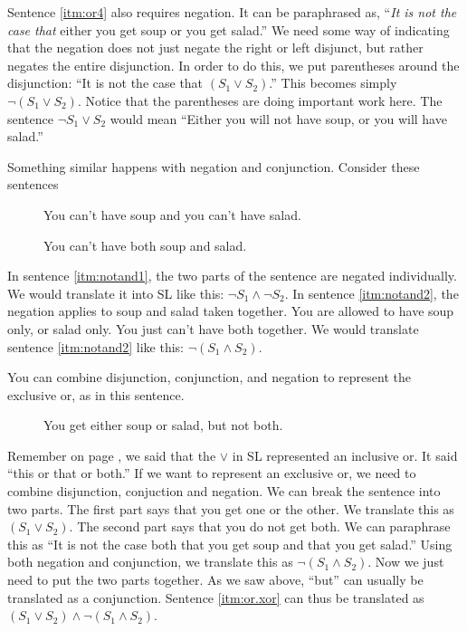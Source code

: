 Sentence \ref{itm:or4} also requires negation. It can be paraphrased as, ``\emph{It is not the case that} either you get soup or you get salad.'' We need some way of indicating that the negation does not just negate the right or left disjunct, but rather negates the entire disjunction. In order to do this, we put parentheses around the disjunction: ``It is not the case that $(S_1 \lor S_2)$.'' This becomes simply $\lnot (S_1 \lor S_2)$. Notice that the parentheses are doing important work here. The sentence $\lnot S_1 \lor S_2$ would mean ``Either you will not have soup, or you will have salad.''

Something similar happens with negation and conjunction. Consider these sentences

\begin{description}
\item[\label{itm:notand1}] You can't have soup and you can't have salad.
\item[\label{itm:notand2}] You can't have both soup and salad.
\end{description}

In sentence \ref{itm:notand1}, the two parts of the sentence are negated individually. We would translate it into SL like this: $\lnot S_1 \land \lnot S_2$. In sentence \ref{itm:notand2}, the negation applies to soup and salad taken together. You are allowed to have soup only, or salad only. You just can't have both together. We would translate sentence \ref{itm:notand2} like this: $\lnot(S_1 \land S_2)$.

You can combine disjunction, conjunction, and negation to represent the exclusive or, as in this sentence.

\begin{description}
\item[\label{itm:or.xor}] You get either soup or salad, but not both.
\end{description}

Remember on page \pageref{def:inclusive_or}, we said that the $\lor$ in SL represented an inclusive or. It said ``this or that or both.'' If we want to represent an exclusive or, we need to combine disjunction, conjuction and negation. We can break the sentence into two parts. The first part says that you get one or the other. We translate this as $(S_1 \lor S_2)$. The second part says that you do not get both. We can paraphrase this as ``It is not the case both that you get soup and that you get salad.'' Using both negation and conjunction, we translate this as $\lnot(S_1 \land S_2)$. Now we just need to put the two parts together. As we saw above, ``but'' can usually be translated as a conjunction. Sentence \ref{itm:or.xor} can thus be translated as $(S_1 \lor S_2) \land \lnot(S_1 \land S_2)$.



